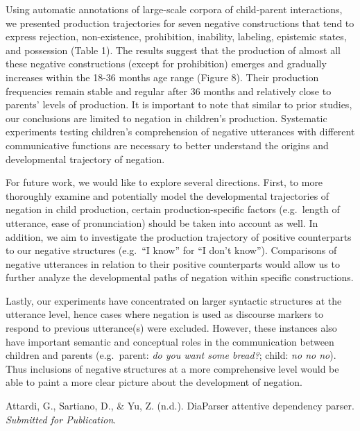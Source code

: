 \documentclass[
  english,
  man,floatsintext]{apa6}
\begin{document}
Using automatic annotations of large-scale corpora of child-parent interactions, we presented production trajectories for seven negative constructions that tend to express rejection, non-existence, prohibition, inability, labeling, epistemic states, and possession (Table 1). The results suggest that the production of almost all these negative constructions (except for prohibition) emerges and gradually increases within the 18-36 months age range (Figure 8). Their production frequencies remain stable and regular after 36 months and relatively close to parents' levels of production. It is important to note that similar to prior studies, our conclusions are limited to negation in children's production. Systematic experiments testing children's comprehension of negative utterances with different communicative functions are necessary to better understand the origins and developmental trajectory of negation.

For future work, we would like to explore several directions. First, to more thoroughly examine and potentially model the developmental trajectories of negation in child production, certain production-specific factors (e.g.~length of utterance, ease of pronunciation) should be taken into account as well. In addition, we aim to investigate the production trajectory of positive counterparts to our negative structures (e.g.~\enquote{I know} for \enquote{I don't know}). Comparisons of negative utterances in relation to their positive counterparts would allow us to further analyze the developmental paths of negation within specific constructions.

Lastly, our experiments have concentrated on larger syntactic structures at the utterance level, hence cases where negation is used as discourse markers to respond to previous utterance(s) were excluded. However, these instances also have important semantic and conceptual roles in the communication between children and parents (e.g.~parent: \emph{do you want some bread?}; child: \emph{no no no}). Thus inclusions of negative structures at a more comprehensive level would be able to paint a more clear picture about the development of negation.

\begingroup
\setlength{\parindent}{-0.5in}
\setlength{\leftskip}{0.5in}

\endgroup

\hypertarget{refs}{}
\leavevmode\hypertarget{ref-diaparser}{}%
Attardi, G., Sartiano, D., \& Yu, Z. (n.d.). DiaParser attentive dependency parser. \emph{Submitted for Publication}.
\end{document}
